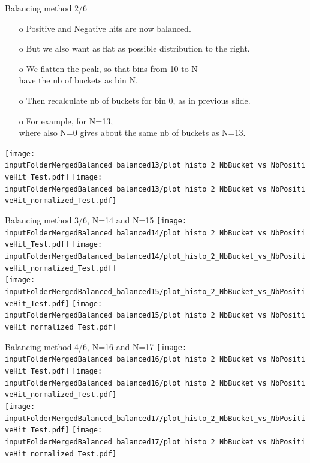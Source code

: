 \documentclass{beamer}
\begin{document}
\begin{frame}{Balancing method 2/6}
\begin{enumerate}
\item[o] Positive and Negative hits are now balanced.
\item[o] But we also want as flat as possible distribution to the right.
\item[o] We flatten the peak, so that bins from 10 to N \\ have the nb of buckets as bin N.  
\item[o] Then recalculate nb of buckets for bin 0, as in previous slide.
\item[o] For example, for N=13, \\ where also N=0 gives about the same nb of buckets as N=13. 
\end{enumerate}
\texttt{[image: \\inputFolderMergedBalanced\_balanced13/plot\_histo\_2\_NbBucket\_vs\_NbPositiveHit\_Test.pdf]}
\texttt{[image: \\inputFolderMergedBalanced\_balanced13/plot\_histo\_2\_NbBucket\_vs\_NbPositiveHit\_normalized\_Test.pdf]}
\end{frame}
\clearpage

\begin{frame}{Balancing method 3/6, N=14 and N=15}
\texttt{[image: \\inputFolderMergedBalanced\_balanced14/plot\_histo\_2\_NbBucket\_vs\_NbPositiveHit\_Test.pdf]}
\texttt{[image: \\inputFolderMergedBalanced\_balanced14/plot\_histo\_2\_NbBucket\_vs\_NbPositiveHit\_normalized\_Test.pdf]}\\
\texttt{[image: \\inputFolderMergedBalanced\_balanced15/plot\_histo\_2\_NbBucket\_vs\_NbPositiveHit\_Test.pdf]}
\texttt{[image: \\inputFolderMergedBalanced\_balanced15/plot\_histo\_2\_NbBucket\_vs\_NbPositiveHit\_normalized\_Test.pdf]}
\end{frame}
\clearpage

\begin{frame}{Balancing method 4/6, N=16 and N=17}
\texttt{[image: \\inputFolderMergedBalanced\_balanced16/plot\_histo\_2\_NbBucket\_vs\_NbPositiveHit\_Test.pdf]}
\texttt{[image: \\inputFolderMergedBalanced\_balanced16/plot\_histo\_2\_NbBucket\_vs\_NbPositiveHit\_normalized\_Test.pdf]}\\
\texttt{[image: \\inputFolderMergedBalanced\_balanced17/plot\_histo\_2\_NbBucket\_vs\_NbPositiveHit\_Test.pdf]}
\texttt{[image: \\inputFolderMergedBalanced\_balanced17/plot\_histo\_2\_NbBucket\_vs\_NbPositiveHit\_normalized\_Test.pdf]}
\end{frame}
\clearpage
\end{document}
